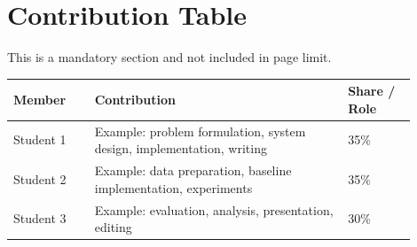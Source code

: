 \documentclass{article}
\begin{document}
\section*{Contribution Table}
This is a mandatory section and not included in page limit.
\begin{table}[h]
    \centering
    \small
    \begin{tabular}{p{0.18\linewidth} p{0.57\linewidth} p{0.15\linewidth}}
        \toprule
        \textbf{Member} & \textbf{Contribution} & \textbf{Share / Role} \\
        \midrule
        Student 1 & Example: problem formulation, system design, implementation, writing & 35\% \\
        Student 2 & Example: data preparation, baseline implementation, experiments & 35\% \\
        Student 3 & Example: evaluation, analysis, presentation, editing & 30\% \\
        \bottomrule
    \end{tabular}
\end{table}
\end{document}
